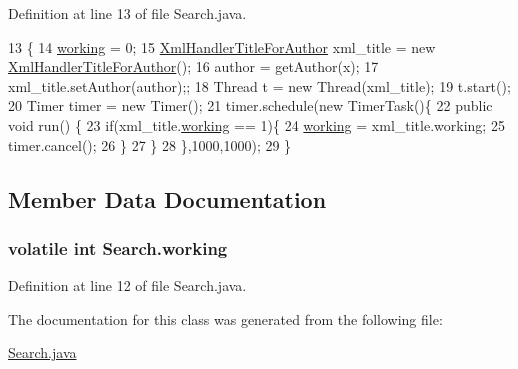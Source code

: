 Definition at line 13 of file Search.\-java.


\begin{DoxyCode}
13                                                                     \{
14         \hyperlink{classSearch_a02e8edf97002a1cb7a0212339fd9f2df}{working}  = 0;
15         \hyperlink{classXmlHandlerTitleForAuthor}{XmlHandlerTitleForAuthor} xml\_title = \textcolor{keyword}{new} 
      \hyperlink{classXmlHandlerTitleForAuthor}{XmlHandlerTitleForAuthor}();
16         author = getAuthor(x);
17         xml\_title.setAuthor(author);;
18         Thread t = \textcolor{keyword}{new} Thread(xml\_title);
19         t.start();
20         Timer timer = \textcolor{keyword}{new} Timer();
21         timer.schedule(\textcolor{keyword}{new} TimerTask()\{
22             \textcolor{keyword}{public} \textcolor{keywordtype}{void} run() \{ 
23                 \textcolor{keywordflow}{if}(xml\_title.\hyperlink{classXmlHandlerTitleForAuthor_aacfb0b6097f6d67493b600563cc91ec7}{working} == 1)\{
24                     \hyperlink{classSearch_a02e8edf97002a1cb7a0212339fd9f2df}{working} = xml\_title.working;
25                     timer.cancel();
26                 \}
27             \}
28         \},1000,1000);
29     \}
\end{DoxyCode}


\subsection{Member Data Documentation}
\hypertarget{classSearch_a02e8edf97002a1cb7a0212339fd9f2df}{
\subsubsection[{working}]{\setlength{\rightskip}{0pt plus 5cm}volatile int Search.\-working}}\label{classSearch_a02e8edf97002a1cb7a0212339fd9f2df}


Definition at line 12 of file Search.\-java.



The documentation for this class was generated from the following file\-:\begin{DoxyCompactItemize}
\item 
\hyperlink{Search_8java}{Search.\-java}\end{DoxyCompactItemize}
